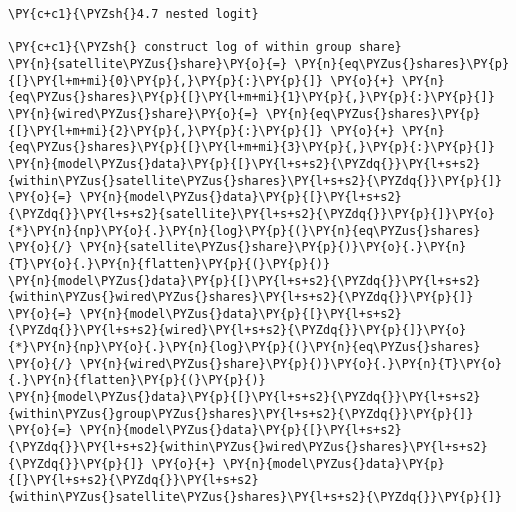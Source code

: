     \begin{tcolorbox}[breakable, size=fbox, boxrule=1pt, pad at break*=1mm,colback=cellbackground, colframe=cellborder]
\begin{Verbatim}[commandchars=\\\{\}]
\PY{c+c1}{\PYZsh{}4.7 nested logit}

\PY{c+c1}{\PYZsh{} construct log of within group share}
\PY{n}{satellite\PYZus{}share}\PY{o}{=} \PY{n}{eq\PYZus{}shares}\PY{p}{[}\PY{l+m+mi}{0}\PY{p}{,}\PY{p}{:}\PY{p}{]} \PY{o}{+} \PY{n}{eq\PYZus{}shares}\PY{p}{[}\PY{l+m+mi}{1}\PY{p}{,}\PY{p}{:}\PY{p}{]}
\PY{n}{wired\PYZus{}share}\PY{o}{=} \PY{n}{eq\PYZus{}shares}\PY{p}{[}\PY{l+m+mi}{2}\PY{p}{,}\PY{p}{:}\PY{p}{]} \PY{o}{+} \PY{n}{eq\PYZus{}shares}\PY{p}{[}\PY{l+m+mi}{3}\PY{p}{,}\PY{p}{:}\PY{p}{]}
\PY{n}{model\PYZus{}data}\PY{p}{[}\PY{l+s+s2}{\PYZdq{}}\PY{l+s+s2}{within\PYZus{}satellite\PYZus{}shares}\PY{l+s+s2}{\PYZdq{}}\PY{p}{]} \PY{o}{=} \PY{n}{model\PYZus{}data}\PY{p}{[}\PY{l+s+s2}{\PYZdq{}}\PY{l+s+s2}{satellite}\PY{l+s+s2}{\PYZdq{}}\PY{p}{]}\PY{o}{*}\PY{n}{np}\PY{o}{.}\PY{n}{log}\PY{p}{(}\PY{n}{eq\PYZus{}shares} \PY{o}{/} \PY{n}{satellite\PYZus{}share}\PY{p}{)}\PY{o}{.}\PY{n}{T}\PY{o}{.}\PY{n}{flatten}\PY{p}{(}\PY{p}{)}
\PY{n}{model\PYZus{}data}\PY{p}{[}\PY{l+s+s2}{\PYZdq{}}\PY{l+s+s2}{within\PYZus{}wired\PYZus{}shares}\PY{l+s+s2}{\PYZdq{}}\PY{p}{]} \PY{o}{=} \PY{n}{model\PYZus{}data}\PY{p}{[}\PY{l+s+s2}{\PYZdq{}}\PY{l+s+s2}{wired}\PY{l+s+s2}{\PYZdq{}}\PY{p}{]}\PY{o}{*}\PY{n}{np}\PY{o}{.}\PY{n}{log}\PY{p}{(}\PY{n}{eq\PYZus{}shares} \PY{o}{/} \PY{n}{wired\PYZus{}share}\PY{p}{)}\PY{o}{.}\PY{n}{T}\PY{o}{.}\PY{n}{flatten}\PY{p}{(}\PY{p}{)}
\PY{n}{model\PYZus{}data}\PY{p}{[}\PY{l+s+s2}{\PYZdq{}}\PY{l+s+s2}{within\PYZus{}group\PYZus{}shares}\PY{l+s+s2}{\PYZdq{}}\PY{p}{]} \PY{o}{=} \PY{n}{model\PYZus{}data}\PY{p}{[}\PY{l+s+s2}{\PYZdq{}}\PY{l+s+s2}{within\PYZus{}wired\PYZus{}shares}\PY{l+s+s2}{\PYZdq{}}\PY{p}{]} \PY{o}{+} \PY{n}{model\PYZus{}data}\PY{p}{[}\PY{l+s+s2}{\PYZdq{}}\PY{l+s+s2}{within\PYZus{}satellite\PYZus{}shares}\PY{l+s+s2}{\PYZdq{}}\PY{p}{]}


\end{Verbatim}
\end{tcolorbox}
